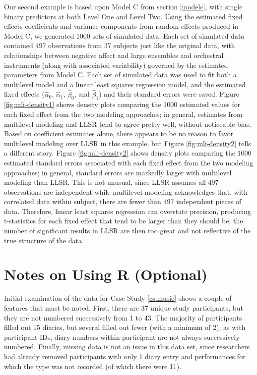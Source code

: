 \documentclass[
]{krantz}
\begin{document}
Our second example is based upon Model C from section \ref{modelc}, with single binary predictors at both Level One and Level Two. Using the estimated fixed effects coefficients and variance components from random effects produced in Model C, we generated 1000 sets of simulated data. Each set of simulated data contained 497 observations from 37 subjects just like the original data, with relationships between negative affect and large ensembles and orchestral instruments (along with associated variability) governed by the estimated parameters from Model C. Each set of simulated data was used to fit both a multilevel model and a linear least squares regression model, and the estimated fixed effects (\(\hat{\alpha}_{0}\), \(\hat{\alpha}_{1}\), \(\hat{\beta}_{0}\), and \(\hat{\beta}_{1}\)) and their standard errors were saved. Figure \ref{fig:mli-density1} shows density plots comparing the 1000 estimated values for each fixed effect from the two modeling approaches; in general, estimates from multilevel modeling and LLSR tend to agree pretty well, without noticeable bias. Based on coefficient estimates alone, there appears to be no reason to favor multilevel modeling over LLSR in this example, but Figure \ref{fig:mli-density2} tells a different story. Figure \ref{fig:mli-density2} shows density plots comparing the 1000 estimated standard errors associated with each fixed effect from the two modeling approaches; in general, standard errors are markedly larger with multilevel modeling than LLSR. This is not unusual, since LLSR assumes all 497 observations are independent while multilevel modeling acknowledges that, with correlated data within subject, there are fewer than 497 independent pieces of data. Therefore, linear least squares regression can overstate precision, producing t-statistics for each fixed effect that tend to be larger than they should be; the number of significant results in LLSR are then too great and not reflective of the true structure of the data.

\hypertarget{notesr8}{%
\section{Notes on Using R (Optional)}\label{notesr8}}

Initial examination of the data for Case Study \ref{cs:music} shows a couple of features that must be noted. First, there are 37 unique study participants, but they are not numbered successively from 1 to 43. The majority of participants filled out 15 diaries, but several filled out fewer (with a minimum of 2); as with participant IDs, diary numbers within participant are not always successively numbered. Finally, missing data is not an issue in this data set, since researchers had already removed participants with only 1 diary entry and performances for which the type was not recorded (of which there were 11).
\end{document}
